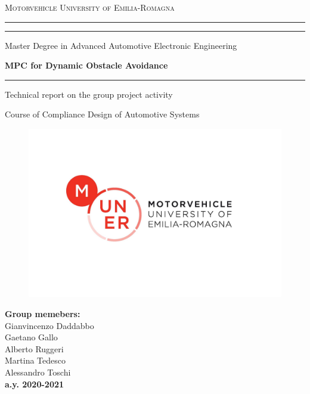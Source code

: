\documentclass[11pt,a4paper]{article}
\begin{document}
\justifying


\begin{titlepage}
\begin{center}
{{\Large{\textsc{Motorvehicle University of Emilia-Romagna}}}} \rule[0.1cm]{15.8cm}{0.1mm}
\rule[0.5cm]{15.8cm}{0.6mm}
Master Degree in Advanced Automotive Electronic Engineering

\end{center}

\vspace{15mm}
\begin{center}
{\LARGE{\bf MPC for Dynamic Obstacle Avoidance}}
\rule[0.1cm]{15.8cm}{0.1mm}
\begin{LARGE}

Technical report on the group project activity\\


\end{LARGE}
\vspace{5mm}
Course of Compliance Design of Automotive Systems
\end{center}

\begin{center}
 \begin{figure}[H]
          \includegraphics[width=1\textwidth]{Figures/MUNER_logo.jpg}
          \end{figure}

 {\large\bf Group memebers:\\}
 {Gianvincenzo Daddabbo}\\
{Gaetano Gallo}\\
{Alberto Ruggeri}\\
{Martina Tedesco}\\
{Alessandro Toschi}\\



\vspace{4mm}
{\large\bf a.y. 2020-2021}
\end{center}
\end{titlepage}
\end{document}
